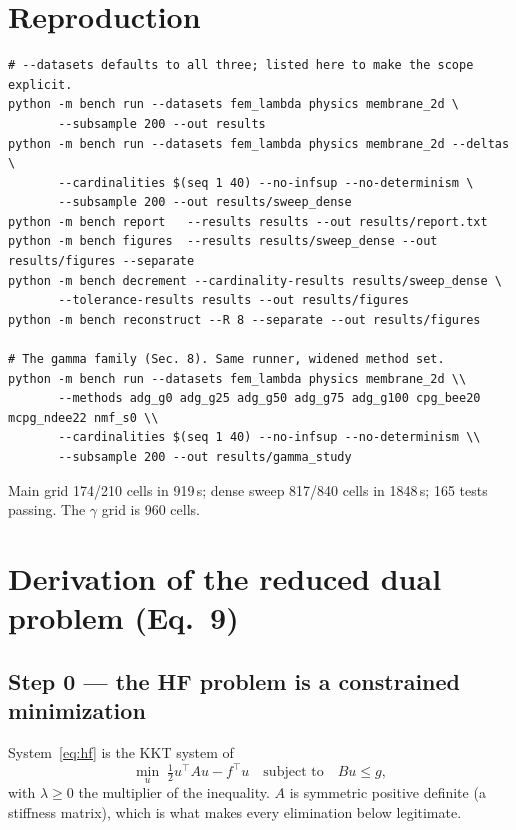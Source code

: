 \documentclass[11pt,a4paper]{article}
\begin{document}
\section*{Reproduction}
\begin{verbatim}
# --datasets defaults to all three; listed here to make the scope explicit.
python -m bench run --datasets fem_lambda physics membrane_2d \
       --subsample 200 --out results
python -m bench run --datasets fem_lambda physics membrane_2d --deltas \
       --cardinalities $(seq 1 40) --no-infsup --no-determinism \
       --subsample 200 --out results/sweep_dense
python -m bench report   --results results --out results/report.txt
python -m bench figures  --results results/sweep_dense --out results/figures --separate
python -m bench decrement --cardinality-results results/sweep_dense \
       --tolerance-results results --out results/figures
python -m bench reconstruct --R 8 --separate --out results/figures

# The gamma family (Sec. 8). Same runner, widened method set.
python -m bench run --datasets fem_lambda physics membrane_2d \\
       --methods adg_g0 adg_g25 adg_g50 adg_g75 adg_g100 cpg_bee20 mcpg_ndee22 nmf_s0 \\
       --cardinalities $(seq 1 40) --no-infsup --no-determinism \\
       --subsample 200 --out results/gamma_study
\end{verbatim}
\noindent Main grid 174/210 cells in 919\,s; dense sweep 817/840 cells in 1848\,s;
165 tests passing. The $\gamma$ grid is 960 cells.


\appendix
\section{Derivation of the reduced dual problem (Eq.~9)}\label{app:dual}

\subsection*{Step 0 --- the HF problem is a constrained minimization}
System~\eqref{eq:hf} is the KKT system of
\begin{equation}
\min_{u}\;\tfrac12 u^{\!\top}\!Au - f^{\!\top}u
\quad\text{subject to}\quad Bu\le g ,
\label{eq:primalHF}
\end{equation}
with $\lambda\ge0$ the multiplier of the inequality. $A$ is symmetric positive definite
(a stiffness matrix), which is what makes every elimination below legitimate.
\end{document}

